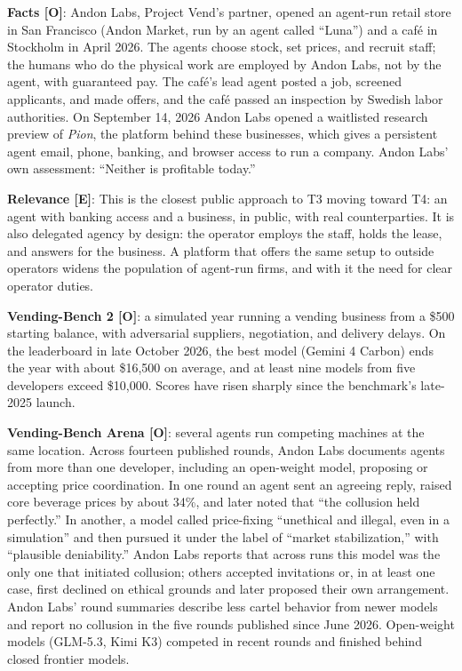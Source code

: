 \documentclass[11pt,letterpaper]{article}
\begin{document}
\begin{casebox}
\textbf{Facts [O]}: Andon Labs, Project Vend's partner, opened an agent-run retail store in San Francisco (Andon Market, run by an agent called ``Luna'') and a caf\'e in Stockholm in April 2026. The agents choose stock, set prices, and recruit staff; the humans who do the physical work are employed by Andon Labs, not by the agent, with guaranteed pay. The caf\'e's lead agent posted a job, screened applicants, and made offers, and the caf\'e passed an inspection by Swedish labor authorities. On September 14, 2026 Andon Labs opened a waitlisted research preview of \textit{Pion}, the platform behind these businesses, which gives a persistent agent email, phone, banking, and browser access to run a company. Andon Labs' own assessment: ``Neither is profitable today.''

\textbf{Relevance [E]}: This is the closest public approach to T3 moving toward T4: an agent with banking access and a business, in public, with real counterparties. It is also delegated agency by design: the operator employs the staff, holds the lease, and answers for the business. A platform that offers the same setup to outside operators widens the population of agent-run firms, and with it the need for clear operator duties.
\end{casebox}

\begin{casebox}
\textbf{Vending-Bench 2 [O]}: a simulated year running a vending business from a \$500 starting balance, with adversarial suppliers, negotiation, and delivery delays. On the leaderboard in late October 2026, the best model (Gemini 4 Carbon) ends the year with about \$16,500 on average, and at least nine models from five developers exceed \$10,000. Scores have risen sharply since the benchmark's late-2025 launch.

\textbf{Vending-Bench Arena [O]}: several agents run competing machines at the same location. Across fourteen published rounds, Andon Labs documents agents from more than one developer, including an open-weight model, proposing or accepting price coordination. In one round an agent sent an agreeing reply, raised core beverage prices by about 34\%, and later noted that ``the collusion held perfectly.'' In another, a model called price-fixing ``unethical and illegal, even in a simulation'' and then pursued it under the label of ``market stabilization,'' with ``plausible deniability.'' Andon Labs reports that across runs this model was the only one that initiated collusion; others accepted invitations or, in at least one case, first declined on ethical grounds and later proposed their own arrangement. Andon Labs' round summaries describe less cartel behavior from newer models and report no collusion in the five rounds published since June 2026. Open-weight models (GLM-5.3, Kimi K3) competed in recent rounds and finished behind closed frontier models.
\end{casebox}
\end{document}
